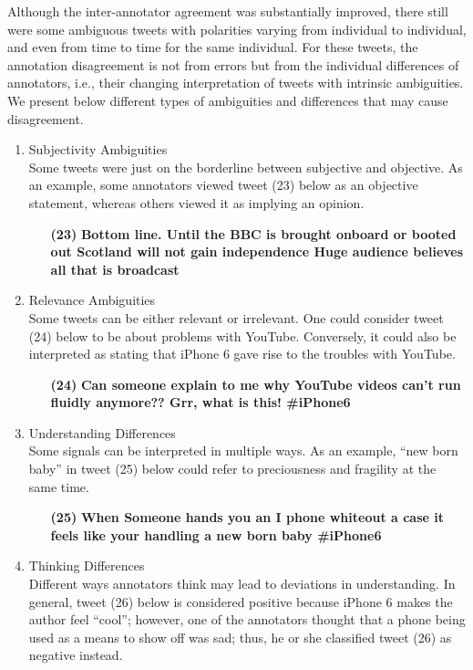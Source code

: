 \documentclass[english]{jnlp_1.4}
\begin{document}
Although the inter-annotator agreement was substantially improved, there still were some ambiguous tweets with polarities varying from individual to individual, and even from time to time for the same individual. For these tweets, the annotation disagreement is not from errors but from the individual differences of annotators, i.e., their changing interpretation of tweets with intrinsic ambiguities. We present below different types of ambiguities and differences that may cause disagreement.
\begin{enumerate}
\item Subjectivity Ambiguities\\
Some tweets were just on the borderline between subjective and objective. As an example, some annotators viewed tweet (23) below as an objective statement, whereas others viewed it as implying an opinion.
\begin{enumerate}
\item[{\bf (23)}] {\bf Bottom line. Until the BBC is brought onboard or booted out Scotland will not gain independence Huge audience believes all that is broadcast}
\end{enumerate}
\item Relevance Ambiguities\\
Some tweets can be either relevant or irrelevant. One could consider tweet (24) below to be about problems with YouTube. Conversely, it could also be interpreted as stating that iPhone 6 gave rise to the troubles with YouTube.
\begin{enumerate}
\item[{\bf (24)}] {\bf Can someone explain to me why YouTube videos can't run fluidly anymore?? Grr, what is this! \#iPhone6}
\end{enumerate}
\item Understanding Differences\\
Some signals can be interpreted in multiple ways. As an example, ``new born baby'' in tweet (25) below could refer to preciousness and fragility at the same time.
\begin{enumerate}
\item[{\bf (25)}] {\bf When Someone hands you an I phone whiteout a case it feels like your handling a new born baby \#iPhone6}
\end{enumerate}
\item Thinking Differences\\
Different ways annotators think may lead to deviations in understanding. In general, tweet (26) below is considered positive because iPhone 6 makes the author feel ``cool''; however, one of the annotators thought that a phone being used as a means to show off was sad; thus, he or she classified tweet (26) as negative instead.

\end{enumerate}
\end{document}
